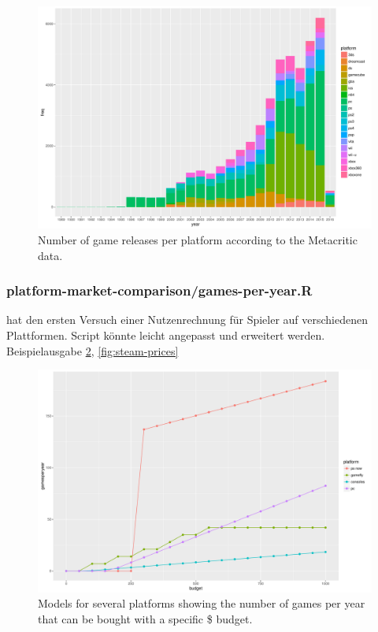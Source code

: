 
\begin{figure}[!t]
	\centering
	\includegraphics[width=1.0\columnwidth]{images/releases-per-year.pdf}
	\caption{Number of game releases per platform according to the Metacritic data.}
\label{fig:releases-per-year}
\end{figure}


\subsubsection{platform-market-comparison/games-per-year.R}

 hat den ersten Versuch einer Nutzenrechnung für Spieler auf verschiedenen Plattformen. Script könnte leicht angepasst und erweitert werden. Beispielausgabe \ref{fig:gamesperyear-over-budget}, \ref{fig:steam-prices}

\begin{figure}[!t]
	\centering
	\includegraphics[width=1.0\columnwidth]{images/gamesperyear-over-budget.pdf}
	\caption{Models for several platforms showing the number of games per year that can be bought with a specific \$ budget.}
\label{fig:gamesperyear-over-budget}
\end{figure}

